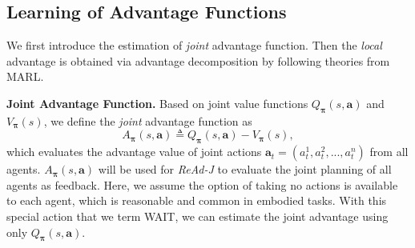 \documentclass[11pt]{article}
\theoremstyle{plain}
\theoremstyle{remark}
\begin{document}
\vspace{-0.2em}
\subsection{Learning of Advantage Functions} \label{section:3-1}
We first introduce the estimation of \emph{joint} advantage function. Then the \emph{local} advantage is obtained via advantage decomposition by following theories from MARL.

\textbf{Joint Advantage Function.} Based on joint value functions $Q_{\boldsymbol{\pi}}(s, \boldsymbol{a})$ and $V_{\boldsymbol{\pi}}(s)$, we define the \emph{joint} advantage function as
\begin{equation*}
A_{\boldsymbol{\pi}}(s, \boldsymbol{a}) \triangleq Q_{\boldsymbol{\pi}}(s, \boldsymbol{a}) - V_{\boldsymbol{\pi}}(s),
\end{equation*}
which evaluates the advantage value of joint actions $\boldsymbol{a}_{t} = (a_{t}^{1}, a_{t}^{2}, ..., a_{t}^{n})$ from all agents. $A_{\boldsymbol{\pi}}(s, \boldsymbol{a})$ will be used for \emph{ReAd-J} to evaluate the joint planning of all agents as feedback.
Here, we assume the option of taking no actions is available to each agent, which is reasonable and common in embodied tasks.
With this special action that we term WAIT, we can estimate the joint advantage using only $Q_{\boldsymbol{\pi}}(s, \boldsymbol{a})$.
\end{document}
